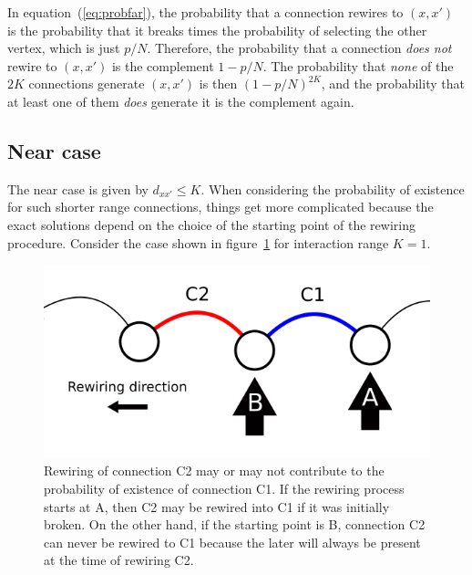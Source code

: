 In equation~(\ref{eq:probfar}), the probability that a connection rewires to $(x,x')$ is the probability that it breaks times the
probability of selecting the other vertex, which is just $p/N$. Therefore, the probability that a connection \textit{does not} rewire
to $(x,x')$ is the complement $1-p/N$. The probability that \textit{none} of the $2K$ connections generate $(x,x')$ is then
$(1-p/N)^{2K}$, and the probability that at least one of them \textit{does} generate it is the complement again.

\subsection{Near case}

The near case is given by $d_{xx'}\leq K$. When considering the probability of existence for such shorter range connections, things get
more complicated because the exact solutions depend on the choice of the starting point of the rewiring procedure. Consider the case
shown in figure~\ref{fig:order_dependence} for interaction range $K=1$.

\begin{figure}[!ht]
    \centering
    \includegraphics[width=0.7\linewidth]{fig/order_dependence.png}
    \caption{Rewiring of connection C2 may or may not contribute to the probability of existence of connection C1. If the rewiring
    process starts at A, then C2 may be rewired into C1 if it was initially broken. On the other hand, if the starting point is B,
    connection C2 can never be rewired to C1 because the later will always be present at the time of rewiring C2.}

    \label{fig:order_dependence}
\end{figure}

